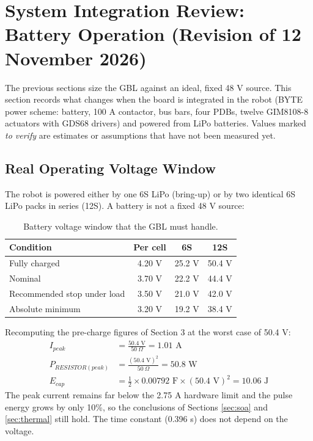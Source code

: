 \documentclass[11pt,a4paper]{article}
\begin{document}
\section{System Integration Review: Battery Operation (Revision of 12 November 2026)}
\label{sec:review}

The previous sections size the GBL against an ideal, fixed 48 V source. This section records what changes when the board is integrated in the robot (BYTE power scheme: battery, 100 A contactor, bus bars, four PDBs, twelve GIM8108-8 actuators with GDS68 drivers) and powered from LiPo batteries. Values marked \textit{to verify} are estimates or assumptions that have not been measured yet.

\subsection{Real Operating Voltage Window}

The robot is powered either by one 6S LiPo (bring-up) or by two identical 6S LiPo packs in series (12S). A battery is not a fixed 48 V source:

\begin{table}[H]
\centering
\begin{tabular}{lccc}
\toprule
Condition & Per cell & 6S & 12S \\
\midrule
Fully charged & 4.20 V & 25.2 V & 50.4 V \\
Nominal & 3.70 V & 22.2 V & 44.4 V \\
Recommended stop under load & 3.50 V & 21.0 V & 42.0 V \\
Absolute minimum & 3.20 V & 19.2 V & 38.4 V \\
\bottomrule
\end{tabular}
\caption{Battery voltage window that the GBL must handle.}
\end{table}

Recomputing the pre-charge figures of Section 3 at the worst case of 50.4 V:
\begin{align}
I_{peak} &= \frac{50.4 \text{ V}}{50\ \Omega} = 1.01 \text{ A} \\
P_{RESISTOR(peak)} &= \frac{(50.4 \text{ V})^2}{50\ \Omega} = 50.8 \text{ W} \\
E_{cap} &= \frac{1}{2} \times 0.00792 \text{ F} \times (50.4 \text{ V})^2 = 10.06 \text{ J}
\end{align}
The peak current remains far below the 2.75 A hardware limit and the pulse energy grows by only 10\%, so the conclusions of Sections \ref{sec:soa} and \ref{sec:thermal} still hold. The time constant (0.396 s) does not depend on the voltage.
\end{document}

